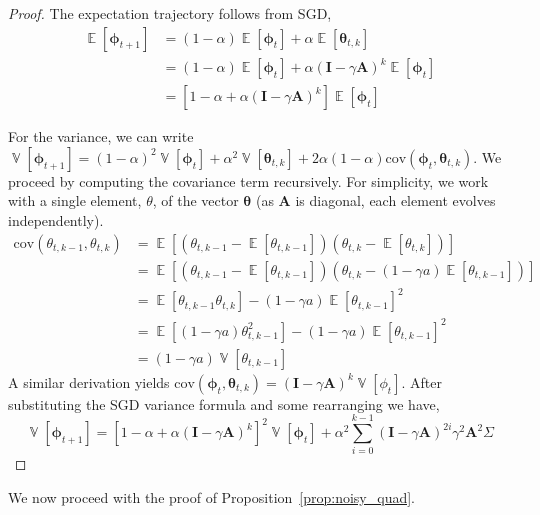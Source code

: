 \documentclass{article}
\newcommand{\bA}{\mathbf{A}}
\newcommand{\bI}{\mathbf{I}}
\newcommand{\E}{\mathop{\mathbb{E}}}
\newcommand{\V}{\mathop{\mathbb{V}}}
\newcommand{\btheta}{\boldsymbol{\theta}}
\newcommand{\bphi}{\boldsymbol{\phi}} \newif\ifcomments
\begin{document}
\begin{proof}
The expectation trajectory follows from SGD,
\begin{align*}
    \E[\bphi_{t+1}] &= (1-\alpha) \E[\bphi_{t}] + \alpha \E[\btheta_{t,k}] \\
    &= (1-\alpha) \E[\bphi_{t}] + \alpha (\bI - \gamma \bA)^k \E[\bphi_{t}] \\
    &= [1 - \alpha + \alpha (\bI - \gamma \bA)^k] \E[\bphi_{t}]
\end{align*}

For the variance, we can write $\V[\bphi_{t+1}] = (1-\alpha)^2 \V[\bphi_{t}] + \alpha^2 \V[\btheta_{t,k}] + 2\alpha(1-\alpha)\text{cov}(\bphi_t, \btheta_{t,k})$. We proceed by computing the covariance term recursively. For simplicity, we work with a single element, $\theta$, of the vector $\btheta$ (as $\bA$ is diagonal, each element evolves independently).
\begin{align*}
    \text{cov}(\theta_{t,k-1}, \theta_{t,k}) &= \E[(\theta_{t,k-1} - \E[\theta_{t,k-1}])(\theta_{t,k} - \E[\theta_{t,k}])] \\
    &= \E[(\theta_{t,k-1} - \E[\theta_{t,k-1}])(\theta_{t,k} - (1-\gamma a)\E[\theta_{t,k-1}])] \\
    &= \E[\theta_{t,k-1}\theta_{t,k}] - (1 - \gamma a)\E[\theta_{t,k-1}]^2 \\
    &= \E[(1-\gamma a)\theta^2_{t,k-1}] - (1 - \gamma a)\E[\theta_{t,k-1}]^2 \\
    &= (1-\gamma a)\V[\theta_{t,k-1}]
\end{align*}
A similar derivation yields $\text{cov}(\bphi_t, \btheta_{t,k}) = (\bI - \gamma \bA)^k \V[\phi_t]$. After substituting the SGD variance formula and some rearranging we have,
\begin{equation*}
    \V[\bphi_{t+1}] = [1-\alpha + \alpha (\bI - \gamma \bA)^k]^2\V[\bphi_t] + \alpha^2 \sum_{i=0}^{k-1} (\bI - \gamma \bA)^{2i}\gamma^2\bA^2\Sigma
\end{equation*}
\end{proof}
We now proceed with the proof of Proposition~\ref{prop:noisy_quad}.
\end{document}
